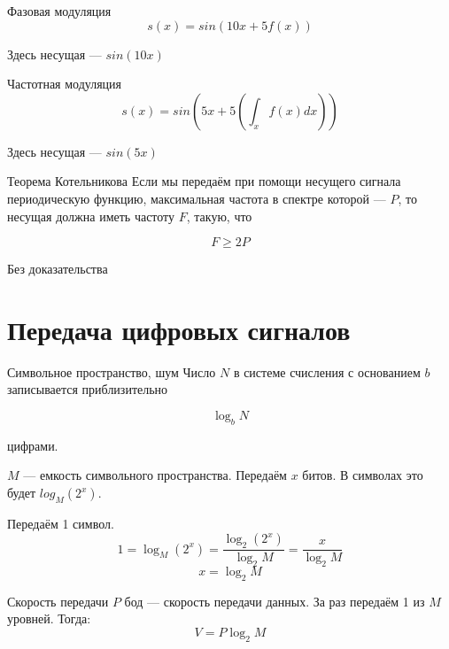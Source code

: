 \documentclass[xetex,aspectratio=43]{beamer}
\begin{document}
\begin{frame}{Фазовая модуляция}
	\[s(x) = sin(10x+5f(x))\]

	\begin{center}
		
	\end{center}	

	
	Здесь несущая --- \(sin(10 x)\)
\end{frame}

\begin{frame}{Частотная модуляция}
	\[s(x) = sin\left(5x+5\left(\int_x f\left( x\right) dx \right)\right)\]
	
	\begin{center}
		
	\end{center}	
	
	Здесь несущая --- \(sin(5 x)\)
\end{frame}

\begin{frame}{Теорема Котельникова}
	Если мы передаём при помощи несущего сигнала периодическую функцию,
	максимальная частота в спектре которой --- \(P\), то несущая должна
	иметь частоту \(F\), такую, что
	
	\[F \ge 2P\]
	
	Без доказательства		
\end{frame}

\section{Передача цифровых сигналов}

\begin{frame}{Символьное пространство, шум}
	Число \(N\) в системе счисления с основанием \(b\) записывается
	приблизительно
	
	\[\log_b N\]
	
	цифрами.
	
	\pause
	
	\(M\) --- емкость символьного пространства. Передаём \(x\) битов. В
	символах это будет \(log_M (2^x)\).
	
	Передаём 1 символ.
	\[1 = \log_M (2^x) = \frac{\log_2 (2^x)}{\log_2 M} = \frac{x}{\log_2 M}\]
	\[x = \log_2 M\]
\end{frame}

\begin{frame}{Скорость передачи}
	\(P\) бод --- скорость передачи данных. За раз передаём 1 из \(M\)
	уровней. Тогда: \[V = P \log_2 M\]
\end{frame}
\end{document}

